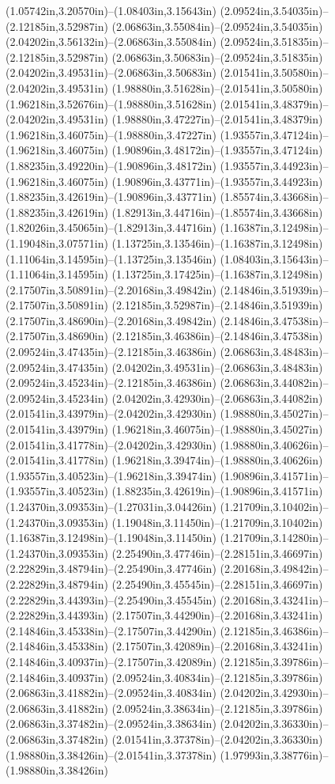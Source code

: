 (1.05742in,3.20570in)--(1.08403in,3.15643in) (2.09524in,3.54035in)--(2.12185in,3.52987in) (2.06863in,3.55084in)--(2.09524in,3.54035in) (2.04202in,3.56132in)--(2.06863in,3.55084in) (2.09524in,3.51835in)--(2.12185in,3.52987in) (2.06863in,3.50683in)--(2.09524in,3.51835in) (2.04202in,3.49531in)--(2.06863in,3.50683in) (2.01541in,3.50580in)--(2.04202in,3.49531in) (1.98880in,3.51628in)--(2.01541in,3.50580in) (1.96218in,3.52676in)--(1.98880in,3.51628in) (2.01541in,3.48379in)--(2.04202in,3.49531in) (1.98880in,3.47227in)--(2.01541in,3.48379in) (1.96218in,3.46075in)--(1.98880in,3.47227in) (1.93557in,3.47124in)--(1.96218in,3.46075in) (1.90896in,3.48172in)--(1.93557in,3.47124in) (1.88235in,3.49220in)--(1.90896in,3.48172in) (1.93557in,3.44923in)--(1.96218in,3.46075in) (1.90896in,3.43771in)--(1.93557in,3.44923in) (1.88235in,3.42619in)--(1.90896in,3.43771in) (1.85574in,3.43668in)--(1.88235in,3.42619in) (1.82913in,3.44716in)--(1.85574in,3.43668in) (1.82026in,3.45065in)--(1.82913in,3.44716in) (1.16387in,3.12498in)--(1.19048in,3.07571in) (1.13725in,3.13546in)--(1.16387in,3.12498in) (1.11064in,3.14595in)--(1.13725in,3.13546in) (1.08403in,3.15643in)--(1.11064in,3.14595in) (1.13725in,3.17425in)--(1.16387in,3.12498in) (2.17507in,3.50891in)--(2.20168in,3.49842in) (2.14846in,3.51939in)--(2.17507in,3.50891in) (2.12185in,3.52987in)--(2.14846in,3.51939in) (2.17507in,3.48690in)--(2.20168in,3.49842in) (2.14846in,3.47538in)--(2.17507in,3.48690in) (2.12185in,3.46386in)--(2.14846in,3.47538in) (2.09524in,3.47435in)--(2.12185in,3.46386in) (2.06863in,3.48483in)--(2.09524in,3.47435in) (2.04202in,3.49531in)--(2.06863in,3.48483in) (2.09524in,3.45234in)--(2.12185in,3.46386in) (2.06863in,3.44082in)--(2.09524in,3.45234in) (2.04202in,3.42930in)--(2.06863in,3.44082in) (2.01541in,3.43979in)--(2.04202in,3.42930in) (1.98880in,3.45027in)--(2.01541in,3.43979in) (1.96218in,3.46075in)--(1.98880in,3.45027in) (2.01541in,3.41778in)--(2.04202in,3.42930in) (1.98880in,3.40626in)--(2.01541in,3.41778in) (1.96218in,3.39474in)--(1.98880in,3.40626in) (1.93557in,3.40523in)--(1.96218in,3.39474in) (1.90896in,3.41571in)--(1.93557in,3.40523in) (1.88235in,3.42619in)--(1.90896in,3.41571in) (1.24370in,3.09353in)--(1.27031in,3.04426in) (1.21709in,3.10402in)--(1.24370in,3.09353in) (1.19048in,3.11450in)--(1.21709in,3.10402in) (1.16387in,3.12498in)--(1.19048in,3.11450in) (1.21709in,3.14280in)--(1.24370in,3.09353in) (2.25490in,3.47746in)--(2.28151in,3.46697in) (2.22829in,3.48794in)--(2.25490in,3.47746in) (2.20168in,3.49842in)--(2.22829in,3.48794in) (2.25490in,3.45545in)--(2.28151in,3.46697in) (2.22829in,3.44393in)--(2.25490in,3.45545in) (2.20168in,3.43241in)--(2.22829in,3.44393in) (2.17507in,3.44290in)--(2.20168in,3.43241in) (2.14846in,3.45338in)--(2.17507in,3.44290in) (2.12185in,3.46386in)--(2.14846in,3.45338in) (2.17507in,3.42089in)--(2.20168in,3.43241in) (2.14846in,3.40937in)--(2.17507in,3.42089in) (2.12185in,3.39786in)--(2.14846in,3.40937in) (2.09524in,3.40834in)--(2.12185in,3.39786in) (2.06863in,3.41882in)--(2.09524in,3.40834in) (2.04202in,3.42930in)--(2.06863in,3.41882in) (2.09524in,3.38634in)--(2.12185in,3.39786in) (2.06863in,3.37482in)--(2.09524in,3.38634in) (2.04202in,3.36330in)--(2.06863in,3.37482in) (2.01541in,3.37378in)--(2.04202in,3.36330in) (1.98880in,3.38426in)--(2.01541in,3.37378in) (1.97993in,3.38776in)--(1.98880in,3.38426in) 